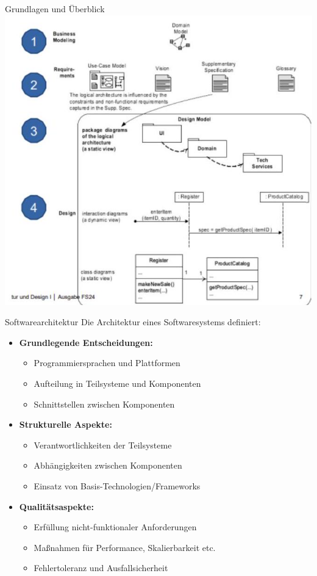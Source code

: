 \begin{concept}{Grundlagen und Überblick}
\includegraphics[width=\linewidth]{images/2024_12_29_0d1d7b5551ea1b4b41bdg-07(2)}
\end{concept}

\begin{definition}{Softwarearchitektur}
Die Architektur eines Softwaresystems definiert:

\begin{itemize}
    \item \textbf{Grundlegende Entscheidungen:}
    \begin{itemize}
        \item Programmiersprachen und Plattformen
        \item Aufteilung in Teilsysteme und Komponenten
        \item Schnittstellen zwischen Komponenten
    \end{itemize}
    
    \item \textbf{Strukturelle Aspekte:}
    \begin{itemize}
        \item Verantwortlichkeiten der Teilsysteme
        \item Abhängigkeiten zwischen Komponenten
        \item Einsatz von Basis-Technologien/Frameworks
    \end{itemize}
    
    \item \textbf{Qualitätsaspekte:}
    \begin{itemize}
        \item Erfüllung nicht-funktionaler Anforderungen
        \item Maßnahmen für Performance, Skalierbarkeit etc.
        \item Fehlertoleranz und Ausfallsicherheit
    \end{itemize}
\end{itemize}
\end{definition}

